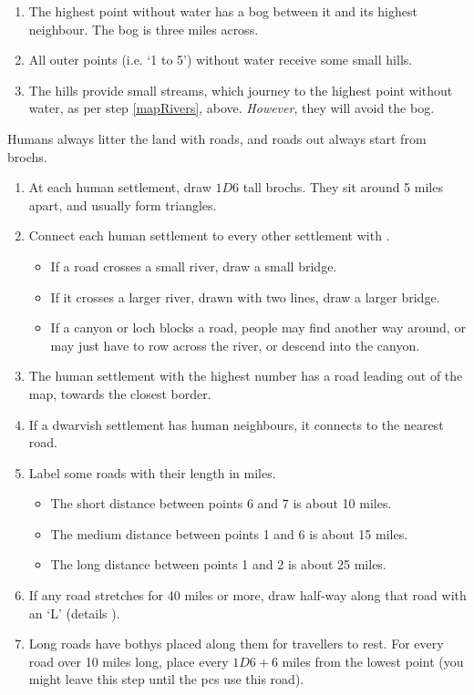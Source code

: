 \begin{multicols}{2}
\begin{enumerate}
  \item
  The highest point without water has a bog between it and its highest neighbour.
  The bog is three miles across.
  \item
  All outer points (i.e. `1 to 5') without water receive some small hills.
  \item
  The hills provide small streams, which journey to the highest point without water, as per step \ref{mapRivers}, above.
  \textit{However}, they will avoid the bog.
\end{enumerate}

\label{drawRoads}

Humans always litter the land with roads, and roads out always start from \glspl{broch}.

\begin{enumerate}
  \item
  At each human settlement, draw $1D6$ tall \glspl{broch}.
  They sit around 5 miles apart, and usually form triangles.
  \item
  Connect each human settlement to every other settlement with .
  \begin{itemize}
    \item
    If a road crosses a small river, draw a small bridge.
    \item
    If it crosses a larger river, drawn with two lines, draw a larger bridge.
    \item
    If a canyon or loch blocks a road, people may find another way around, or may just have to row across the river, or descend into the canyon.
  \end{itemize}
  \item
  The human settlement with the highest number has a road leading out of the map, towards the closest border.
  \label{roadOut}
  \item
  If a dwarvish settlement has human neighbours, it connects to the nearest road.
  \item
  Label some roads with their length in miles.
  \begin{itemize}
    \item
    The short distance between points 6 and 7 is about 10 miles.
    \item
    The medium distance between points 1 and 6 is about 15 miles.
    \item
    The long distance between points 1 and 2 is about 25 miles.
  \end{itemize}
  \item
  If any road stretches for 40 miles or more, draw  half-way along that road with an `L' (details ).
  \item
  Long roads have \glspl{bothy} placed along them for travellers to rest.
  \label{bothyRolls}
  For every road over 10 miles long, place  every $1D6+6$ miles from the lowest point
  (you might leave this step until the \glspl{pc} use this road).
\end{enumerate}


\end{multicols}
